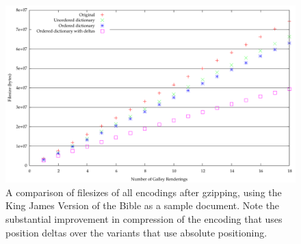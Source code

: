\begin{figure}
  \begin{center}
  \includegraphics[height=\textwidth,angle=90]{gnuplot/kjv-gz}
  \end{center}
  \caption[Comparison of gzips of all encodings]{A comparison of filesizes of all encodings after gzipping, using the King James Version of the Bible as a sample document. Note the substantial improvement in compression of the encoding that uses position deltas over the variants that use absolute positioning.}
  \label{fig:size-all-gz}
\end{figure}




